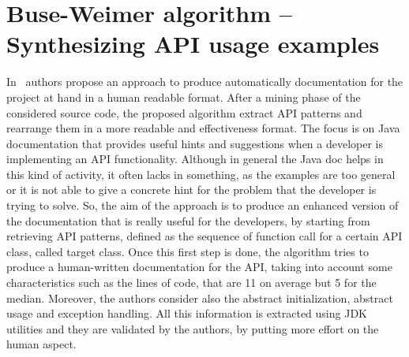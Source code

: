 \section{Buse-Weimer algorithm -- Synthesizing API usage examples}

In~\cite{buse_synthesizing_2012} authors propose an approach to produce 
automatically documentation for the project at hand in a human readable format.
After a mining phase of the considered source code, the proposed algorithm 
extract API patterns and rearrange them in a more readable and effectiveness 
format. The focus is on Java documentation that provides useful hints and 
suggestions when a developer is implementing an API functionality. Although in 
general the Java doc helps in this kind of activity, it often lacks in 
something, as the examples are too general or it is not able to give a concrete 
hint for the problem that the developer is trying to solve. So, the aim of the 
approach is to produce an enhanced version of the documentation that is really 
useful for the developers, by starting from retrieving API patterns, defined as 
the sequence of function call for a certain API class, called target class. 
Once this first step is done, the algorithm tries to produce a human-written 
documentation for the API, taking into account some characteristics such as the 
lines of code, that are 11 on average but 5 for the median. Moreover, the 
authors consider also the abstract initialization, abstract usage and exception 
handling. All this information is extracted using JDK utilities and they are 
validated by the authors, by putting more effort on the human aspect. 

